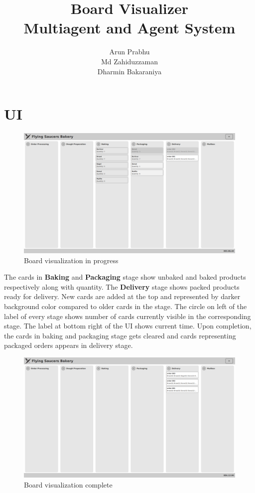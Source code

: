\documentclass[12pt]{article}
\title{Board Visualizer\\Multiagent and Agent System}
\author{Arun Prabhu\\Md Zahiduzzaman\\Dharmin Bakaraniya}
\begin{document}
\maketitle{}
\pagebreak

\section{UI}
\begin{figure}[htpb]
	\centering
	\includegraphics[width=1.0\linewidth]{visualizer-ui.png}
	\caption{Board visualization in progress}
\end{figure}

The cards in \textbf{Baking} and \textbf{Packaging} stage show unbaked and baked products respectively along with quantity. The \textbf{Delivery} stage shows packed products ready for delivery. New cards are added at the top and represented by darker background color compared to older cards in the stage. The circle on left of the label of every stage shows number of cards currently visible in the corresponding stage. The label at bottom right of the UI shows current time. Upon completion, the cards in baking and packaging stage gets cleared and cards representing packaged orders appears in delivery stage.

\newpage
\begin{figure}[htpb]
	\centering
	\includegraphics[width=1.0\linewidth]{visualizer-complete.png}
	\caption{Board visualization complete}
\end{figure}
\end{document}
